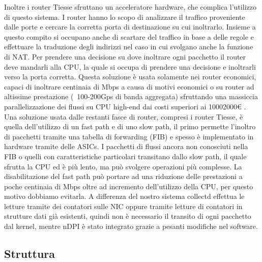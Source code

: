 Inoltre i router Tiesse sfruttano un acceleratore hardware, che complica l'utilizzo di questo sistema. I router hanno lo scopo di analizzare il traffico proveniente dalle porte e cercare la corretta porta di destinazione su cui inoltrarlo. Insieme a questo compito si occupano anche di scartare del traffico in base a delle regole e effettuare la traduzione degli indirizzi nel caso in cui svolgano anche la funzione di NAT. Per prendere una decisione su dove inoltrare ogni pacchetto il router deve mandarli alla CPU, la quale si occupa di prendere una decisione e inoltrarli verso la porta corretta. Questa soluzione è usata solamente nei router economici, capaci di inoltrare centinaia di Mbps a causa di motivi economici o su router ad altissime prestazione (~100-200Gps di banda aggregata) sfruttando una massiccia parallelizzazione dei flussi su CPU high-end dai costi superiori ai 1000\/2000€ \cite{risso_sn}. Una soluzione usata dalle restanti fasce di router, compresi i router Tiesse, è quella dell'utilizzo di un fast path e di uno slow path, il primo permette l'inoltro di pacchetti tramite una tabella di forwarding (FIB) e spesso è implementato in hardware tramite delle ASICs. I pacchetti di flussi ancora non conosciuti nella FIB o quelli con caratteristiche particolari transitano dallo slow path, il quale sfrutta la CPU ed è più lento, ma può svolgere operazioni più complesse. La disabilitazione del fast path può portare ad una riduzione delle prestazioni a poche centinaia di Mbps oltre ad incremento dell'utilizzo della CPU, per questo motivo dobbiamo evitarla. 
A differenza del nostro sistema collectd effettua le letture tramite dei contatori sulle NIC oppure tramite letture di contatori in strutture dati già esistenti, quindi non è necessario il transito di ogni pacchetto dal kernel, mentre nDPI è stato integrato grazie a pesanti modifiche nel software.





\subsection{Struttura}

